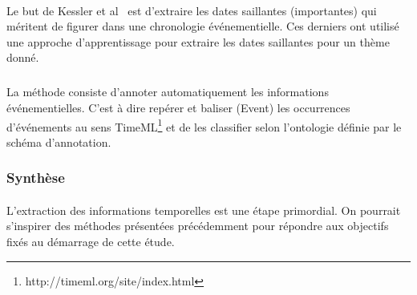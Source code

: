 \documentclass[12pt,a4	]{report}
\begin{document}
\paragraph{}
Le but de Kessler et al~\cite{kessler2013} est d'extraire les dates saillantes (importantes) qui méritent de figurer dans une chronologie événementielle.
Ces derniers ont utilisé une approche d’apprentissage pour extraire les dates saillantes pour un thème donné.
\subparagraph{}
La méthode consiste d'annoter automatiquement les informations événementielles. C’est à dire repérer et baliser (Event) les occurrences d’événements au sens TimeML\footnote{http://timeml.org/site/index.html} et de les classifier selon l’ontologie définie par le schéma d’annotation. 
\subsubsection*{Synthèse}
\paragraph{}
L'extraction des informations temporelles est une étape primordial. On pourrait s'inspirer des méthodes présentées précédemment pour répondre aux objectifs fixés au démarrage de cette étude.


\printglossary[title=Glossaire]
\end{document}
